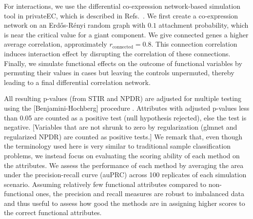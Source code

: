 \documentclass[10pt]{article}
\begin{document}
For interactions, we use the differential co-expression network-based simulation tool in privateEC, which is described in Refs.~\cite{le17, lareau15}. 
We first create a co-expression network on an Erd\H{o}s-R\'enyi random graph with $0.1$ attachment probability, which is near the critical value for a giant component.
We give connected genes a higher average correlation, approximately $r_{\text{connected}}=0.8$. %
This connection correlation induces interaction effect by disrupting the correlation of these connections. %
Finally, we simulate functional effects on the outcome of functional variables by permuting their values in cases but leaving the controls unpermuted, thereby leading to a final differential correlation network. 

All resulting p-values (from STIR and NPDR) are adjusted for multiple testing using the [Benjamini-Hochberg] procedure \cite{benjamini01}.
Attributes with adjusted p-values less than 0.05 are counted as a positive test (null hypothesis rejected), else the test is negative.
[Variables that are not shrunk to zero by regularization (glmnet and regularized NPDR) are counted as positive tests.]
We remark that, even though the terminology used here is very similar to traditional sample classification problems, we instead focus on evaluating the scoring ability of each method on the attributes.
We assess the performance of each method by averaging the area under the precision-recall curve (auPRC) across 100 replicates of each simulation scenario.
Assuming relatively few functional attributes compared to non-functional ones, the precision and recall measures are robust to imbalanced data and thus useful to assess how good the methods are in assigning higher scores to the correct functional attributes.
\end{document}
